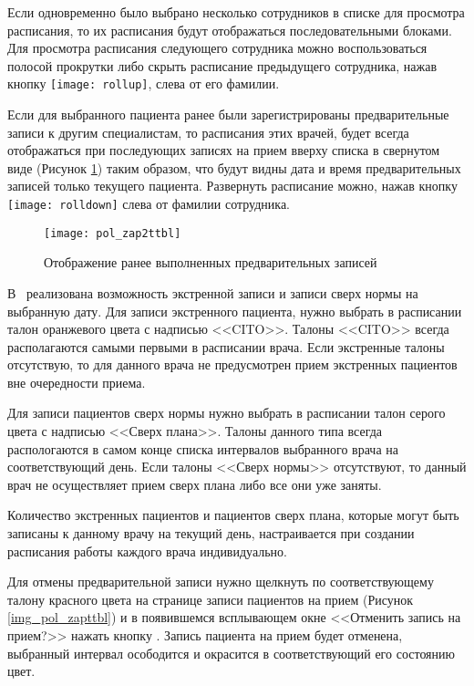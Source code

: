Если одновременно было выбрано несколько сотрудников в списке для просмотра расписания, то их расписания будут отображаться последовательными блоками. Для просмотра расписания следующего сотрудника можно воспользоваться полосой прокрутки либо скрыть расписание предыдущего сотрудника, нажав кнопку \texttt{[image: rollup]}, слева от его фамилии.

Если для выбранного пациента ранее были зарегистрированы предварительные записи к другим специалистам, то расписания этих врачей, будет всегда отображаться при последующих записях на прием вверху списка в свернутом виде (Рисунок \ref{img_pol_zap2ttbl}) таким образом, что будут видны дата и время предварительных записей только текущего пациента. Развернуть расписание можно, нажав кнопку \texttt{[image: rolldown]} слева от фамилии сотрудника.

 \begin{figure}[ht]\centering
  \texttt{[image: pol\_zap2ttbl]}
  \caption{Отображение ранее выполненных предварительных записей}
  \label{img_pol_zap2ttbl}
 \end{figure}
     
В \tmis~реализована возможность экстренной записи и записи сверх нормы на выбранную дату. Для записи экстренного пациента, нужно выбрать в расписании талон оранжевого цвета с надписью <<CITO>>. Талоны <<CITO>> всегда располагаются самыми первыми в расписании врача. Если экстренные талоны отсутствую, то для данного врача не предусмотрен прием экстренных пациентов вне очередности приема.

Для записи пациентов сверх нормы нужно выбрать в расписании талон серого цвета с надписью <<Сверх плана>>. Талоны данного типа всегда распологаются в самом конце списка интервалов выбранного врача на соответствующий день. Если талоны <<Сверх нормы>> отсутствуют, то данный врач не осуществляет прием сверх плана либо все они уже заняты. 

\begin{prim}
Количество экстренных пациентов и пациентов сверх плана, которые могут быть записаны к данному врачу на текущий день, настраивается при создании расписания работы каждого врача индивидуально. 
\end{prim}

Для отмены предварительной записи нужно щелкнуть по соответствующему талону красного цвета на странице записи пациентов на прием (Рисунок \ref{img_pol_zapttbl}) и в появившемся всплывающем окне <<Отменить запись на прием?>> нажать кнопку . Запись пациента на прием будет отменена, выбранный интервал осободится и окрасится в соответствующий его состоянию цвет.

